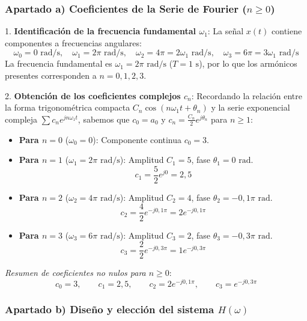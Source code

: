 \begin{resolucion}
\subsubsection*{Apartado a) Coeficientes de la Serie de Fourier ($n \ge 0$)}

1. \textbf{Identificación de la frecuencia fundamental $\omega_1$}:
   La señal $x(t)$ contiene componentes a frecuencias angulares:
   \[
   \omega_0 = 0\text{ rad/s}, \quad \omega_1 = 2\pi\text{ rad/s}, \quad \omega_2 = 4\pi = 2\omega_1\text{ rad/s}, \quad \omega_3 = 6\pi = 3\omega_1\text{ rad/s}
   \]
   La frecuencia fundamental es $\omega_1 = 2\pi\text{ rad/s}$ ($T = 1\text{ s}$), por lo que los armónicos presentes corresponden a $n = 0, 1, 2, 3$.

2. \textbf{Obtención de los coeficientes complejos $c_n$}:
   Recordando la relación entre la forma trigonométrica compacta $C_n \cos(n\omega_1 t + \theta_n)$ y la serie exponencial compleja $\sum c_n e^{j n \omega_1 t}$, sabemos que $c_0 = a_0$ y $c_n = \frac{C_n}{2} e^{j \theta_n}$ para $n \ge 1$:
   \begin{itemize}
       \item \textbf{Para $n = 0$} ($\omega_0 = 0$): Componente continua $c_0 = 3$.
       \item \textbf{Para $n = 1$} ($\omega_1 = 2\pi\text{ rad/s}$): Amplitud $C_1 = 5$, fase $\theta_1 = 0\text{ rad}$.
         \[
         c_1 = \frac{5}{2} e^{j 0} = 2{,}5
         \]
       \item \textbf{Para $n = 2$} ($\omega_2 = 4\pi\text{ rad/s}$): Amplitud $C_2 = 4$, fase $\theta_2 = -0{,}1\pi\text{ rad}$.
         \[
         c_2 = \frac{4}{2} e^{-j 0{,}1\pi} = 2 e^{-j 0{,}1\pi}
         \]
       \item \textbf{Para $n = 3$} ($\omega_3 = 6\pi\text{ rad/s}$): Amplitud $C_3 = 2$, fase $\theta_3 = -0{,}3\pi\text{ rad}$.
         \[
         c_3 = \frac{2}{2} e^{-j 0{,}3\pi} = 1 e^{-j 0{,}3\pi}
         \]
   \end{itemize}

\textit{Resumen de coeficientes no nulos para $n \ge 0$}:
\[
c_0 = 3, \qquad c_1 = 2{,}5, \qquad c_2 = 2 e^{-j 0{,}1\pi}, \qquad c_3 = e^{-j 0{,}3\pi}
\]

\subsubsection*{Apartado b) Diseño y elección del sistema $H(\omega)$}


\end{resolucion}
